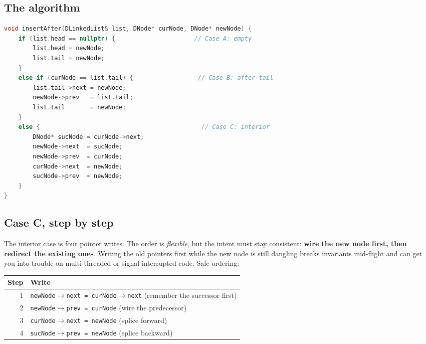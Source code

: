 \documentclass[11pt]{article}
\begin{document}
\subsection{The algorithm}

\begin{examplebox}
\begin{lstlisting}[basicstyle=\ttfamily\small,frame=single,language=C++]
void insertAfter(DLinkedList& list, DNode* curNode, DNode* newNode) {
    if (list.head == nullptr) {                      // Case A: empty
        list.head = newNode;
        list.tail = newNode;
    }
    else if (curNode == list.tail) {                  // Case B: after tail
        list.tail->next = newNode;
        newNode->prev   = list.tail;
        list.tail       = newNode;
    }
    else {                                             // Case C: interior
        DNode* sucNode = curNode->next;
        newNode->next  = sucNode;
        newNode->prev  = curNode;
        curNode->next  = newNode;
        sucNode->prev  = newNode;
    }
}
\end{lstlisting}
\end{examplebox}

\subsection*{Case C, step by step}

The interior case is four pointer writes. The order is
\emph{flexible}, but the intent must stay consistent: \textbf{wire
the new node first, then redirect the existing ones}. Writing the
old pointers first while the new node is still dangling breaks
invariants mid-flight and can get you into trouble on multi-threaded
or signal-interrupted code. Safe ordering:

\begin{center}
\footnotesize
\renewcommand{\arraystretch}{1.3}
\begin{tabular}{@{}rl@{}}
\hline
\textbf{Step} & \textbf{Write} \\
\hline
1 & \texttt{newNode$\to$next = curNode$\to$next}  (remember the successor first) \\
2 & \texttt{newNode$\to$prev = curNode}            (wire the predecessor) \\
3 & \texttt{curNode$\to$next = newNode}            (splice forward) \\
4 & \texttt{sucNode$\to$prev = newNode}            (splice backward) \\
\hline
\end{tabular}
\end{center}
\end{document}
